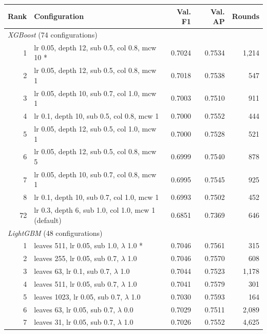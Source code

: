 \begin{tabular}{rlrrr}
\toprule
Rank & Configuration & Val. F1 & Val. AP & Rounds \\
\midrule
\multicolumn{5}{l}{\emph{XGBoost} (74 configurations)} \\
1 & lr 0.05, depth 12, sub 0.5, col 0.8, mcw 10 * & 0.7024 & 0.7534 & 1,214 \\
2 & lr 0.05, depth 12, sub 0.5, col 0.8, mcw 1 & 0.7018 & 0.7538 & 547 \\
3 & lr 0.05, depth 10, sub 0.7, col 1.0, mcw 1 & 0.7003 & 0.7510 & 911 \\
4 & lr 0.1, depth 10, sub 0.5, col 0.8, mcw 1 & 0.7000 & 0.7552 & 444 \\
5 & lr 0.05, depth 12, sub 0.5, col 1.0, mcw 1 & 0.7000 & 0.7528 & 521 \\
6 & lr 0.05, depth 12, sub 0.5, col 0.8, mcw 5 & 0.6999 & 0.7540 & 878 \\
7 & lr 0.05, depth 10, sub 0.7, col 0.8, mcw 1 & 0.6995 & 0.7545 & 925 \\
8 & lr 0.1, depth 10, sub 0.7, col 1.0, mcw 1 & 0.6993 & 0.7502 & 452 \\
72 & lr 0.3, depth 6, sub 1.0, col 1.0, mcw 1 (default) & 0.6851 & 0.7369 & 646 \\
\midrule
\multicolumn{5}{l}{\emph{LightGBM} (48 configurations)} \\
1 & leaves 511, lr 0.05, sub 1.0, $\lambda$ 1.0 * & 0.7046 & 0.7561 & 315 \\
2 & leaves 255, lr 0.05, sub 0.7, $\lambda$ 1.0 & 0.7046 & 0.7570 & 608 \\
3 & leaves 63, lr 0.1, sub 0.7, $\lambda$ 1.0 & 0.7044 & 0.7523 & 1,178 \\
4 & leaves 511, lr 0.05, sub 0.7, $\lambda$ 1.0 & 0.7041 & 0.7579 & 301 \\
5 & leaves 1023, lr 0.05, sub 0.7, $\lambda$ 1.0 & 0.7030 & 0.7593 & 164 \\
6 & leaves 63, lr 0.05, sub 0.7, $\lambda$ 0.0 & 0.7029 & 0.7511 & 2,089 \\
7 & leaves 31, lr 0.05, sub 0.7, $\lambda$ 1.0 & 0.7026 & 0.7552 & 4,625 \\

\end{tabular}
